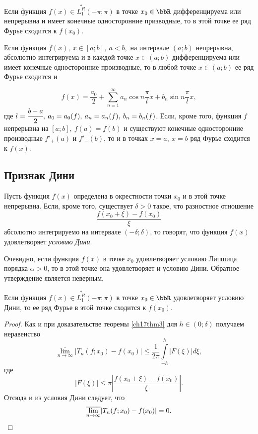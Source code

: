 \begin{cons}
Если функция $f(x) \in \overset{*}{L^{R}_1}(-\pi;\pi)$ в точке $x_0 \in \bbR$ дифференцируема или непрерывна и имеет конечные односторонние призводные, то в этой точке ее ряд Фурье сходится к $f(x_0)$.
\end{cons}

\begin{cons}
Если функция $f(x), \: x \in [a;b], \: a < b,$ на интервале $(a;b)$ непрерывна, абсолютно интегрируема и в каждой точке $x \in (a;b)$ дифференцируема или имеет конечные односторонние производные, то в любой точке $x \in (a;b)$ ее ряд Фурье сходится и 

$$
f(x) = \frac{a_0}{2} + \sum\limits_{n = 1}^{\infty} a_n \cos{n \frac{\pi}{l} x} + b_n \sin{n \frac{\pi}{l} x},
$$
где $l = \cfrac{b - a}{2}, \: a_0 = a_0(f), \: a_n = a_n(f), \: b_n = b_n(f)$. Если, кроме того, функция $f$ непрерывна на $[a;b], \: f(a) = f(b)$ и существуют конечные односторонние производные $f'_+(a)$ и $f'_-(b)$, то и в точках $x = a, \: x = b$ ряд Фурье сходится к $f(x)$.
\end{cons}


\subsection{Признак Дини}
Пусть функция $f(x)$ определена в окрестности точки $x_0$ и в этой точке непрерывна. Если, кроме того, существует $\delta > 0$ такое, что разностное отношение
$$
\frac{f(x_0 + \xi) - f(x_0)}{\xi}
$$
абсолютно интегрируемо на интервале $(-\delta;\delta)$, то говорят, что функция $f(x)$ удовлетворяет \textit{условию Дини}.

Очевидно, если функция $f(x)$ в точке $x_0$ удовлетворяет условию Липшица порядка $\alpha > 0$, то в этой точке она удовлетворяет и условию Дини. Обратное утверждение является неверным.

\begin{thm}  \label{ch17thm4}
Если функция $f(x) \in \overset{*}{L^{R}_1}(-\pi;\pi)$ в точке $x_0 \in \bbR$ удовлетворяет условию Дини, то ее ряд Фурье в этой точке сходится к $f(x_0)$.
\end{thm}
\begin{proof}
Как и при доказательстве теоремы \ref{ch17thm3} для $h \in (0;\delta)$ получаем неравенство
$$
\overline{\lim\limits_{n \to \infty}}|T_n(f; x_0) - f(x_0)| \le \frac{1}{2\pi}\int\limits_{-h}^{h}|F(\xi)|d\xi,
$$
где
$$
|F(\xi)| \le \pi\left|\frac{f(x_0 + \xi) - f(x_0)}{\xi}\right|.
$$
Отсюда и из условия Дини следует, что
\begin{equation*}
\overline{\lim\limits_{n \to \infty}}|T_n(f; x_0) - f(x_0)| = 0. \qedhere
\end{equation*}
\end{proof}

